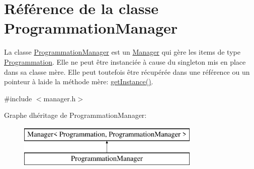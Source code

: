\hypertarget{class_programmation_manager}{}\section{Référence de la classe Programmation\+Manager}
\label{class_programmation_manager}


La classe \hyperlink{class_programmation_manager}{Programmation\+Manager} est un \hyperlink{class_manager}{Manager} qui gère les items de type \hyperlink{class_programmation}{Programmation}. Elle ne peut être instanciée à cause du singleton mis en place dans sa classe mère. Elle peut toutefois être récupérée dans une référence ou un pointeur à l\textquotesingle{}aide la méthode mère\+: \hyperlink{class_manager_a8372e4f1e14f3605a57d839b152325ed}{get\+Instance()}.  




{\ttfamily \#include $<$manager.\+h$>$}

Graphe d\textquotesingle{}héritage de Programmation\+Manager\+:\begin{figure}[H]
\begin{center}
\leavevmode
\includegraphics[height=2.000000cm]{class_programmation_manager}
\end{center}
\end{figure}
